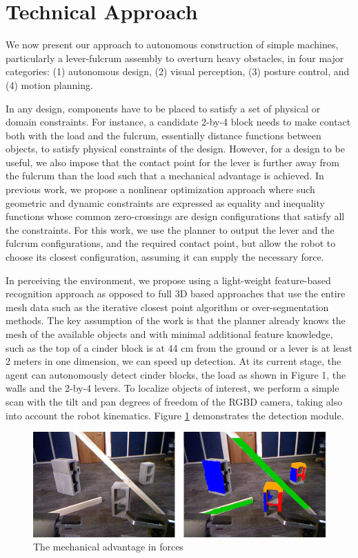 \documentclass{article}
\begin{document}
\section{Technical Approach}

We now present our approach to autonomous construction of simple machines, particularly a
lever-fulcrum assembly to overturn heavy obstacles, in four major categories: (1) autonomous design,
(2) visual perception, (3) posture control, and (4) motion planning.

In any design, components have to be placed to satisfy a set of physical or domain constraints. For
instance, a candidate 2-by-4 block needs to make contact both with the load and the fulcrum,
essentially distance functions between objects, to satisfy physical constraints of the design.
However, for a design to be useful, we also impose that the contact point for the lever is further
away from the fulcrum than the load such that a mechanical advantage is achieved. In previous work,
we propose a nonlinear optimization approach where such geometric and dynamic constraints are
expressed as equality and inequality functions whose common zero-crossings are design configurations
that satisfy all the constraints. For this work, we use the planner to output the lever and the
fulcrum configurations, and the required contact point, but allow the robot to choose its closest
configuration, assuming it can supply the necessary force.

In perceiving the environment, we propose using a light-weight feature-based recognition approach as
opposed to full 3D based approaches that use the entire mesh data such as the iterative closest
point algorithm or over-segmentation methods. The key assumption of the work is that the planner
already knows the mesh of the available objects and with minimal additional feature knowledge, such
as the top of a cinder block is at 44 cm from the ground or a lever is at least 2 meters in one
dimension, we can speed up detection. At its current stage, the agent can autonomously detect cinder
blocks, the load as shown in Figure 1, the walls and the 2-by-4 levers. To localize objects of
interest, we perform a simple scan with the tilt and pan degrees of freedom of the RGBD camera,
taking also into account the robot kinematics. Figure \ref{fig:detection} demonstrates the detection module.

\begin{figure}[ht!] 
  \centering
  \includegraphics[width=1.0\linewidth]{Figures/detection.png}
  \caption{The mechanical advantage in forces}
  \label{fig:detection}
\end{figure}
\end{document}
